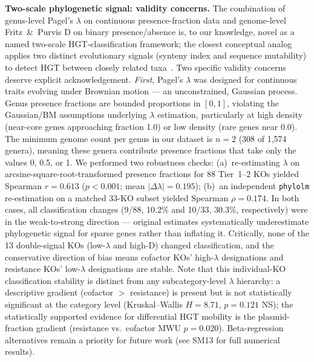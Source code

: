 \documentclass[times]{zHenriquesLab-StyleBioRxiv}
\begin{document}
\textbf{Two-scale phylogenetic signal: validity concerns.}
The combination of genus-level Pagel's $\lambda$ on continuous presence-fraction data and genome-level Fritz~\&~Purvis D on binary presence/absence is, to our knowledge, novel as a named two-scale HGT-classification framework; the closest conceptual analog applies two distinct evolutionary signals (synteny index and sequence mutability) to detect HGT between closely related taxa~\cite{adato2015}.
Two specific validity concerns deserve explicit acknowledgement.
\emph{First}, Pagel's $\lambda$ was designed for continuous traits evolving under Brownian motion --- an unconstrained, Gaussian process. Genus presence fractions are bounded proportions in $[0, 1]$, violating the Gaussian/BM assumptions underlying $\lambda$ estimation, particularly at high density (near-core genes approaching fraction 1.0) or low density (rare genes near 0.0). The minimum genome count per genus in our dataset is $n = 2$ (308 of 1,574 genera), meaning these genera contribute presence fractions that take only the values 0, 0.5, or 1. We performed two robustness checks: (a)~re-estimating $\lambda$ on arcsine-square-root-transformed presence fractions for 88 Tier~1--2 KOs yielded Spearman $r = 0.613$ ($p < 0.001$; mean $|\Delta\lambda| = 0.195$); (b)~an independent \texttt{phylolm} re-estimation on a matched 33-KO subset yielded Spearman $\rho = 0.174$. In both cases, all classification changes (9/88, 10.2\% and 10/33, 30.3\%, respectively) were in the weak-to-strong direction --- original estimates systematically underestimate phylogenetic signal for sparse genes rather than inflating it. Critically, none of the 13 double-signal KOs (low-$\lambda$ and high-D) changed classification, and the conservative direction of bias means cofactor KOs' high-$\lambda$ designations and resistance KOs' low-$\lambda$ designations are stable. Note that this individual-KO classification stability is distinct from any subcategory-level $\lambda$ hierarchy: a descriptive gradient (cofactor $>$ resistance) is present but is not statistically significant at the category level (Kruskal--Wallis $H = 8.71$, $p = 0.121$ NS); the statistically supported evidence for differential HGT mobility is the plasmid-fraction gradient (resistance vs.\ cofactor MWU $p = 0.020$). Beta-regression alternatives remain a priority for future work (see SM13 for full numerical results).
\end{document}
